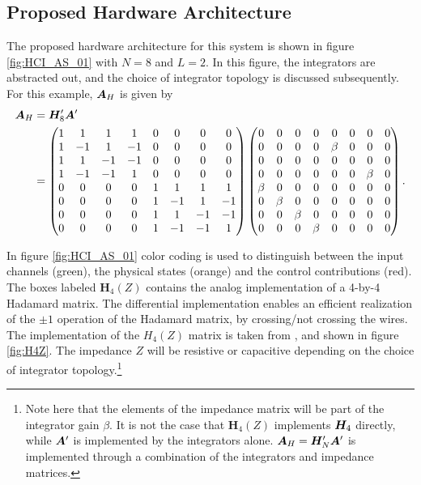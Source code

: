 \subsection{Proposed Hardware Architecture}
The proposed hardware architecture for this system is shown in figure \ref{fig:HCI_AS_01} with $N=8$ and $L=2$. In this figure, the integrators are abstracted out, and the choice of integrator topology is discussed subsequently. For this example, $\bm{A}_H$ is given by
\begin{align}
    \bm{A}_H & = \bm{H}'_8 \bm{A}' \\  & =
    \begin{pmatrix}
        1 & 1 & 1 & 1 & 0 & 0 & 0 & 0 \\
        1 & -1 & 1 & -1 & 0 & 0 & 0 & 0 \\
        1 & 1 & -1 & -1 & 0 & 0 & 0 & 0 \\
        1 & -1 & -1 & 1 & 0 & 0 & 0 & 0 \\
        0 & 0 & 0 & 0 & 1 & 1 & 1 & 1 \\
        0 & 0 & 0 & 0 & 1 & -1 & 1 & -1 \\
        0 & 0 & 0 & 0 & 1 & 1 & -1 & -1 \\
        0 & 0 & 0 & 0 & 1 & -1 & -1 & 1
    \end{pmatrix}
    \begin{pmatrix}
        0 & 0 & 0 & 0 & 0 & 0 & 0 & 0 \\
        0 & 0 & 0 & 0 & \beta & 0 & 0 & 0 \\
        0 & 0 & 0 & 0 & 0 & 0 & 0 & 0 \\
        0 & 0 & 0 & 0 & 0 & 0 & \beta & 0 \\
        \beta & 0 & 0 & 0 & 0 & 0 & 0 & 0 \\
        0 & \beta & 0 & 0 & 0 & 0 & 0 & 0 \\
        0 & 0 & \beta & 0 & 0 & 0 & 0 & 0 \\
        0 & 0 & 0 & \beta & 0 & 0 & 0 & 0
    \end{pmatrix}.
\end{align}

In figure \ref{fig:HCI_AS_01} color coding is used to distinguish between the input channels (green), the physical states (orange) and the control contributions (red). The boxes labeled $\bm{H}_4(Z)$ contains the analog implementation of a 4-by-4 Hadamard matrix. The differential implementation enables an efficient realization of the $\pm 1$ operation of the Hadamard matrix, by crossing/not crossing the wires. The implementation of the $H_4(Z)$ matrix is taken from \cite{malmberg_thesis}, and shown in figure \ref{fig:H4Z}. The impedance $Z$ will be resistive or capacitive depending on the choice of integrator topology.\footnote{Note here that the elements of the impedance matrix will be part of the integrator gain $\beta$. It is not the case that $\bm{H}_4(Z)$ implements $\bm{H_}{4}$ directly, while $\bm{A}'$ is implemented by the integrators alone. $\bm{A}_H = \bm{H}'_{N}\bm{A}'$ is implemented through a combination of the integrators and impedance matrices.}

